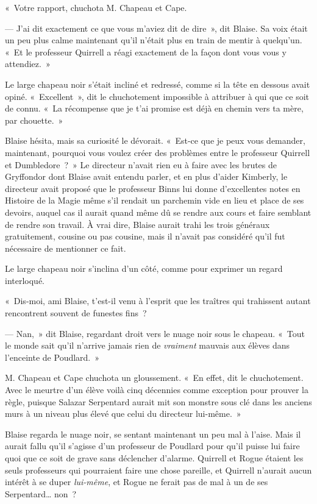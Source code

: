 «~Votre rapport, chuchota M. Chapeau et Cape.

--- J'ai dit exactement ce que vous m'aviez dit de dire~», dit Blaise. Sa voix était un peu plus calme maintenant qu'il n'était plus en train de mentir à quelqu'un. «~Et le professeur Quirrell a réagi exactement de la façon dont vous vous y attendiez.~»

Le large chapeau noir s'était incliné et redressé, comme si la tête en dessous avait opiné. «~Excellent~», dit le chuchotement impossible à attribuer à qui que ce soit de connu. «~La récompense que je t'ai promise est déjà en chemin vers ta mère, par chouette.~»

Blaise hésita, mais sa curiosité le dévorait. «~Est-ce que je peux vous demander, maintenant, pourquoi vous voulez créer des problèmes entre le professeur Quirrell et Dumbledore~?~» Le directeur n'avait rien eu à faire avec les brutes de Gryffondor dont Blaise avait entendu parler, et en plus d'aider Kimberly, le directeur avait proposé que le professeur Binns lui donne d'excellentes notes en Histoire de la Magie même s'il rendait un parchemin vide en lieu et place de ses devoirs, auquel cas il aurait quand même dû se rendre aux cours et faire semblant de rendre son travail. À vrai dire, Blaise aurait trahi les trois généraux gratuitement, cousine ou pas cousine, mais il n'avait pas considéré qu'il fut nécessaire de mentionner ce fait.

Le large chapeau noir s'inclina d'un côté, comme pour exprimer un regard interloqué.

«~Dis-moi, ami Blaise, t'est-il venu à l'esprit que les traîtres qui trahissent autant rencontrent souvent de funestes fins~?

--- Nan,~» dit Blaise, regardant droit vers le nuage noir sous le chapeau. «~Tout le monde sait qu'il n'arrive jamais rien de \emph{vraiment} mauvais aux élèves dans l'enceinte de Poudlard.~»

M. Chapeau et Cape chuchota un gloussement. «~En effet, dit le chuchotement. Avec le meurtre d'un élève voilà cinq décennies comme exception pour prouver la règle, puisque Salazar Serpentard aurait mit son monstre sous clé dans les anciens murs à un niveau plus élevé que celui du directeur lui-même.~»

Blaise regarda le nuage noir, se sentant maintenant un peu mal à l'aise. Mais il aurait fallu qu'il s'agisse d'un professeur de Poudlard pour qu'il puisse lui faire quoi que ce soit de grave sans déclencher d'alarme. Quirrell et Rogue étaient les seuls professeurs qui pourraient faire une chose pareille, et Quirrell n'aurait aucun intérêt à se duper \emph{lui-même}, et Rogue ne ferait pas de mal à un de ses Serpentard… non~?

